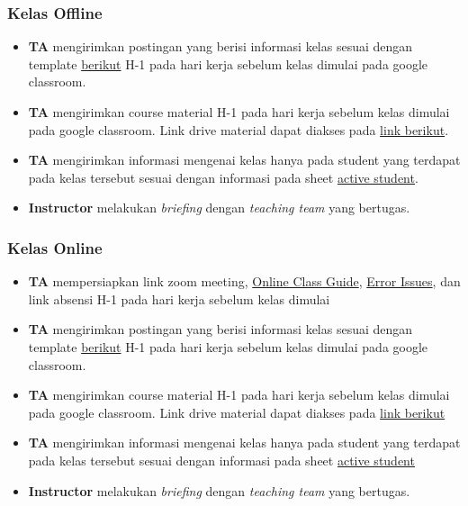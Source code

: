 \documentclass[
]{book}
\providecommand{\tightlist}{%
  \setlength{\itemsep}{0pt}\setlength{\parskip}{0pt}}
\begin{document}
\hypertarget{kelas-offline}{%
\subsubsection{Kelas Offline}\label{kelas-offline}}

\begin{itemize}
\tightlist
\item
  \textbf{TA} mengirimkan postingan yang berisi informasi kelas sesuai dengan template \href{https://docs.google.com/document/d/1leWbp3Eb2AwumFieuHiWStSNOXsKJQJD_h0tAhA2fLs/edit?usp=sharing}{berikut} H-1 pada hari kerja sebelum kelas dimulai pada google classroom.
\item
  \textbf{TA} mengirimkan course material H-1 pada hari kerja sebelum kelas dimulai pada google classroom. Link drive material dapat diakses pada \href{https://drive.google.com/drive/folders/1I1h0p4BkvkUYV8mtDU7bgswE_awOIxWY?usp=sharing}{link berikut}.
\item
  \textbf{TA} mengirimkan informasi mengenai kelas hanya pada student yang terdapat pada kelas tersebut sesuai dengan informasi pada sheet \href{https://docs.google.com/spreadsheets/d/12FB9410fhRhZp9jl5qLe7x-LGw0QTSfLujA-dE867JE/edit?usp=sharing}{active student}.
\item
  \textbf{Instructor} melakukan \emph{briefing} dengan \emph{teaching team} yang bertugas.
\end{itemize}

\hypertarget{kelas-online}{%
\subsubsection{Kelas Online}\label{kelas-online}}

\begin{itemize}
\tightlist
\item
  \textbf{TA} mempersiapkan link zoom meeting, \href{https://docs.google.com/document/d/16algZSEqLos2fksPcbmpUrpvvuVr62msVY13M8uPNos/edit?usp=sharing}{Online Class Guide}, \href{https://docs.google.com/document/d/1ZkhuxSTBjUqzbHeLsRbk8E4L1FFymWH0UmaI3xaomkg/edit?usp=sharing}{Error Issues}, dan link absensi H-1 pada hari kerja sebelum kelas dimulai
\item
  \textbf{TA} mengirimkan postingan yang berisi informasi kelas sesuai dengan template \href{https://docs.google.com/document/d/1leWbp3Eb2AwumFieuHiWStSNOXsKJQJD_h0tAhA2fLs/edit?usp=sharing}{berikut} H-1 pada hari kerja sebelum kelas dimulai pada google classroom.
\item
  \textbf{TA} mengirimkan course material H-1 pada hari kerja sebelum kelas dimulai pada google classroom. Link drive material dapat diakses pada \href{https://drive.google.com/drive/folders/1I1h0p4BkvkUYV8mtDU7bgswE_awOIxWY?usp=sharing}{link berikut}
\item
  \textbf{TA} mengirimkan informasi mengenai kelas hanya pada student yang terdapat pada kelas tersebut sesuai dengan informasi pada sheet \href{https://docs.google.com/spreadsheets/d/12FB9410fhRhZp9jl5qLe7x-LGw0QTSfLujA-dE867JE/edit?usp=sharing}{active student}
\item
  \textbf{Instructor} melakukan \emph{briefing} dengan \emph{teaching team} yang bertugas.
\end{itemize}
\end{document}
